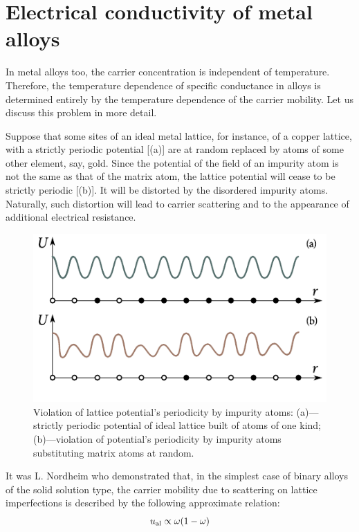 \section{Electrical conductivity of metal alloys}\label{sec:55}

In metal alloys too, the carrier concentration is independent of temperature. Therefore, the temperature dependence of specific conductance in alloys is determined entirely by the temperature dependence of the carrier mobility. Let us discuss this problem in more detail.

Suppose that some sites of an ideal metal lattice, for instance, of a copper lattice, with a strictly periodic potential [(a)] are at random replaced by atoms of some other element, say, gold. Since the potential of the field of an impurity atom is not the same as that of the matrix atom, the lattice potential will cease to be strictly periodic [(b)]. It will be distorted by the disordered impurity atoms. Naturally, such distortion will lead to carrier scattering and to the appearance of additional electrical resistance.

\begin{figure}[t]
	\begin{center}
		\includegraphics[scale=1]{figures/ch_06/fig_6_11.pdf}
		\caption[]{Violation of lattice potential's periodicity by impurity atoms: (a)---strictly periodic potential of ideal lattice built of atoms of one kind; (b)---violation of potential's periodicity by impurity atoms substituting matrix atoms at random.}
		\label{fig:6_11}
	\end{center}
	\vspace{-0.7cm}
\end{figure}

It was L. Nordheim who demonstrated that, in the simplest case of binary alloys of the solid solution type, the carrier mobility due to scattering on lattice imperfections is described by the following approximate relation:
\begin{equation}\label{eq:6_30}
	u_{\text{al}} \propto \omega (1-\omega)
\end{equation}

